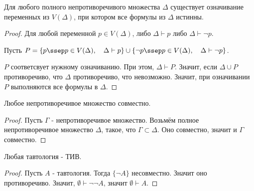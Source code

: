 \begin{lemma} \thmslashn

    Для любого полного непротиворечивого множества $\Delta$ существует означивание переменных из $V(\Delta)$, при котором все формулы из $\Delta$ истинны.
    \begin{proof} \thmslashn
    
        Для любой переменной $p\in V(\Delta)$, либо $\Delta \vdash p$ либо  $\Delta \vdash \neg p$. 

        Пусть $P = \{p \ssep p\in V(\Delta), \quad \Delta \vdash p\} \cup \{\neg p \ssep p\in V(\Delta), \quad \Delta \vdash \neg p\}$.

        $P$ соответсвует нужному означиванию. При этом, $\Delta \vdash P$. Значит, если $\Delta \cup P$ противоречиво, что $\Delta$ противоречиво, что невозможно. Значит, при означивании $P$ выполняются все формулы в $\Delta$.
    \end{proof}
\end{lemma}
\begin{theorem} \thmslashn

    Любое непротиворечивое множество совместно.

    \begin{proof} \thmslashn
    
        Пусть $\Gamma$ - непротиворечивое множество. Возьмём полное непротиворечивое множество $\Delta$, такое, что $\Gamma \subset \Delta$. Оно совместно, значит и $\Gamma$ совместно.
    \end{proof}
\end{theorem}
\begin{consequence} \thmslashn

    Любая тавтология - ТИВ.
    \begin{proof} \thmslashn
    
        Пусть $A$ - тавтология. Тогда $\{\neg A\} $ несовместно. Значит оно противоречиво. Значит, $ \emptyset \vdash \neg \neg A$, значит $ \emptyset \vdash A$.
    \end{proof}
\end{consequence}

